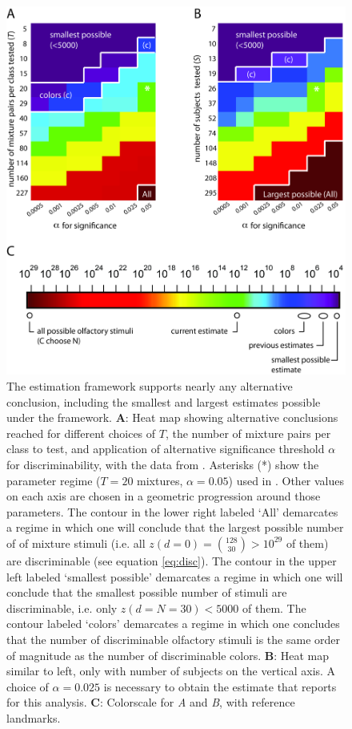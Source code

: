 \documentclass[letterpaper,twocolumn,10pt]{article}
\begin{document}
\begin{figure}
    \centering
    \includegraphics[width=1.0\textwidth]{figures/Fig3_Colormaps}
    \caption{
The estimation framework supports nearly any alternative conclusion, including the smallest and largest estimates possible under the framework. 
\textbf{A}: Heat map showing alternative conclusions reached for different choices of $T$, the number of mixture pairs per class to test, 
and application of alternative significance threshold $\alpha$ for discriminability, with the data from \cite{bushdid_humans_2014}. 
Asterisks (*) show the parameter regime ($T=20$ mixtures, $\alpha=0.05$) used in \cite{bushdid_humans_2014}. 
Other values on each axis are chosen in a geometric progression around those parameters.  
The contour in the lower right labeled `All' demarcates a regime in which one will conclude that the largest possible number of of mixture stimuli (i.e. all $z(d=0)={128 \choose 30} > 10^{29}$ of them) are discriminable (see equation \ref{eq:disc}). 
The contour in the upper left labeled `smallest possible' demarcates a regime in which one will conclude that 
the smallest possible number of stimuli are discriminable, i.e. only $z(d=N=30)<5000$ of them.
The contour labeled `colors' demarcates a regime in which 
one concludes that the number of discriminable olfactory stimuli is the same order of magnitude as the number of discriminable colors. 
\textbf{B}: Heat map similar to left, only with number of subjects on the vertical axis.  
A choice of $\alpha=0.025$ is necessary to obtain the estimate that \cite{bushdid_humans_2014} reports for this analysis.
\textbf{C}: Colorscale for \textit{A} and \textit{B}, with reference landmarks.}
    \label{fig:colormaps}
\end{figure}
\end{document}
